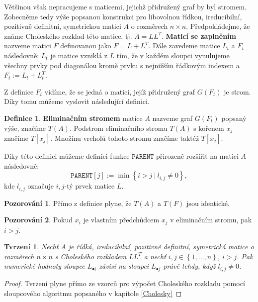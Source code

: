 \documentclass[11pt,american,czech,oneside]{book}
\theoremstyle{plain}
\newtheorem{proposition}{Tvrzení}
\theoremstyle{definition}
\newtheorem{definition}{Definice}
\newtheorem{observation}{Pozorování}
\begin{document}
Většinou však nepracujeme s maticemi, jejichž přidružený graf by byl stromem. Zobecněme tedy výše popsanou konstrukci pro libovolnou řídkou, ireducibilní, pozitivně definitní, symetrickou matici $A$ o rozměrech $n \times n$. Předpokládejme, že známe Choleského rozklad této matice, tj. $A = LL^T$. \textbf{Maticí se zaplněním} nazveme matici $F$ definovanou jako $F = L + L^T$. Dále zavedeme matice $L_t$ a $F_t$ následovně: $L_t$ je matice vzniklá z $L$ tím, že v každém sloupci vynulujeme všechny prvky pod diagonálou
kromě prvku s nejnižším řádkovým indexem a $F_t := L_t + L_t^T$.

Z definice $F_t$ vidíme, že se jedná o matici, jejíž přidružený graf $G(F_t)$ je strom. Díky tomu můžeme vyslovit následující definici.

\begin{definition}
    \textbf{Eliminačním stromem} matice $A$ nazveme graf $G(F_t)$ popsaný výše, značíme $T(A)$.
    Podstrom eliminačního stromu $T(A)$ s kořenem $x_j$ značíme $T[x_j]$. Množinu vrcholů tohoto stromu značíme taktéž $T[x_j]$.
\end{definition}

Díky této definici můžeme definici funkce $\texttt{PARENT}$ přirozeně rozšířit na matici $A$ následovně:
\[
    \texttt{PARENT}[j] := \min \left\{ i > j \ | \ l_{i,j} \neq 0\right\},
\]
kde $l_{i,j}$ označuje $i,j$-tý prvek matice $L$.

\begin{observation}
Přímo z definice plyne, že $T(A)$ a $T(F)$ jsou identické.
\end{observation}

\begin{observation}
Pokud $x_i$ je vlastním předchůdcem $x_j$ v eliminačním stromu, pak $i > j$.
\end{observation}

\begin{proposition}
  \label{ColDepProposition}
  Nechť $A$ je řídká, ireducibilní, pozitivně definitní, symetrická matice o rozměrech $n \times n$ s Choleského rozkladem $LL^T$ a nechť $i,j \in \left\{1,\ldots,n \right\}$, $i > j$. Pak numerické hodnoty sloupce $L_{\bullet i}$ závisí na sloupci $L_{\bullet j}$ právě tehdy,
  když $l_{i,j} \neq 0$.
\end{proposition}
\begin{proof}
  Tvrzení plyne přímo ze vzorců pro výpočet Choleského rozkladu pomocí sloupcového algoritmu popsaného v kapitole \ref{Cholesky}
\end{proof}
\end{document}
